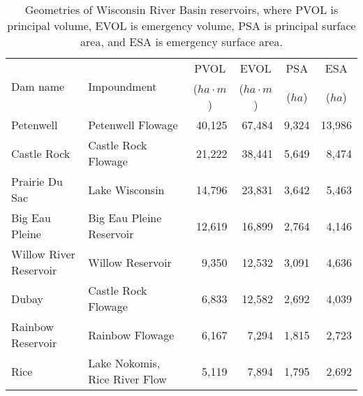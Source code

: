\begin{table}[h!]
	\caption[Geometries of Wisconsin River Basin reservoirs]{Geometries of Wisconsin River Basin reservoirs, where PVOL is principal volume, EVOL is emergency volume, PSA is principal surface area, and ESA is emergency surface area.}
	\centering
	\begin{tabular}{llrrrr}
\hline
		\multirow{2}{*}{Dam  name} & \multirow{2}{*}{Impoundment}  & \multicolumn{1}{c}{PVOL}             & \multicolumn{1}{c}{EVOL}             & \multicolumn{1}{c}{PSA}    & \multicolumn{1}{c}{ESA}    \\
                                   &                               & \multicolumn{1}{c}{($ha \cdot m$)}   & \multicolumn{1}{c}{($ha \cdot m$)}   & \multicolumn{1}{c}{($ha$)} & \multicolumn{1}{c}{($ha$)} \\
\hline \hline
		Petenwell                  & Petenwell Flowage             & 40,125                               & 67,484                               & 9,324                      & 13,986                     \\
		Castle Rock                & Castle Rock Flowage           & 21,222                               & 38,441                               & 5,649                      & 8,474                      \\
		Prairie Du Sac             & Lake Wisconsin                & 14,796                               & 23,831                               & 3,642                      & 5,463                      \\
		Big Eau Pleine             & Big Eau Pleine Reservoir      & 12,619                               & 16,899                               & 2,764                      & 4,146                      \\
		Willow River Reservoir     & Willow Reservoir              & 9,350                                & 12,532                               & 3,091                      & 4,636                      \\
		Dubay                      & Castle Rock Flowage           & 6,833                                & 12,582                               & 2,692                      & 4,039                      \\
		Rainbow Reservoir          & Rainbow Flowage               & 6,167                                & 7,294                                & 1,815                      & 2,723                      \\
		Rice                       & Lake Nokomis, Rice River Flow & 5,119                                & 7,894                                & 1,795                      & 2,692                      \\

\end{tabular}
\end{table}
